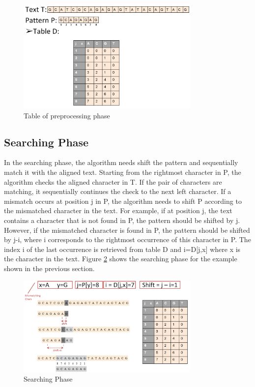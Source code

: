 \documentclass[paper=a4, fontsize=11pt]{scrartcl} %
\numberwithin{equation}{section} %
\numberwithin{figure}{section} %
\numberwithin{table}{section} %
\begin{document}
\begin{figure}[h!]
\centering
\includegraphics[width=0.8\textwidth]{figures/Example_Table.png}
\caption{Table of preprocessing phase}
\label{fig:table}
\end{figure}

\subsection{Searching Phase}
In the searching phase, the algorithm needs shift the pattern and sequentially match it with the aligned text. Starting from the rightmost character in P, the algorithm checks the aligned character in T. If the pair of characters are matching, it sequentially continues the check to the next left character. If a mismatch occurs at position j in P, the algorithm needs to shift P according to the mismatched character in the text. For example, if at position j, the text contains a character that is not found in P, the pattern should be shifted by j. However, if the mismatched character is found in P, the pattern should be shifted by j-i, where i corresponds to the rightmost occurrence of this character in P. The index i of the last occurrence is retrieved from table D and i=D[j,x] where x is the character in the text. Figure \ref{fig:search} shows the searching phase for the example shown in the previous section.

\begin{figure}[h!]
\centering
\includegraphics[width=0.8\textwidth]{figures/searching_phase.png}
\caption{Searching Phase}
\label{fig:search}
\end{figure}
\end{document}
